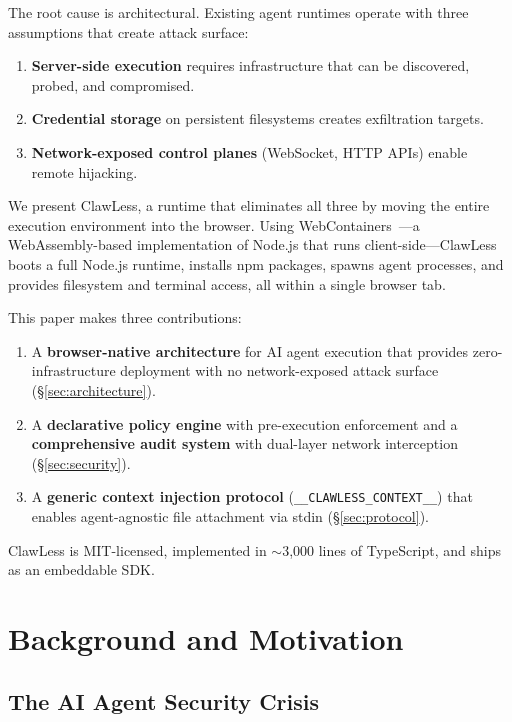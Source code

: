 \documentclass[11pt,twocolumn]{article}
\begin{document}
The root cause is architectural. Existing agent runtimes operate with three assumptions that create attack surface:

\begin{enumerate}[noitemsep]
  \item \textbf{Server-side execution} requires infrastructure that can be discovered, probed, and compromised.
  \item \textbf{Credential storage} on persistent filesystems creates exfiltration targets.
  \item \textbf{Network-exposed control planes} (WebSocket, HTTP APIs) enable remote hijacking.
\end{enumerate}

We present ClawLess, a runtime that eliminates all three by moving the entire execution environment into the browser. Using WebContainers~\cite{webcontainers}---a WebAssembly-based implementation of Node.js that runs client-side---ClawLess boots a full Node.js runtime, installs npm packages, spawns agent processes, and provides filesystem and terminal access, all within a single browser tab.

This paper makes three contributions:

\begin{enumerate}[noitemsep]
  \item A \textbf{browser-native architecture} for AI agent execution that provides zero-infrastructure deployment with no network-exposed attack surface (\S\ref{sec:architecture}).
  \item A \textbf{declarative policy engine} with pre-execution enforcement and a \textbf{comprehensive audit system} with dual-layer network interception (\S\ref{sec:security}).
  \item A \textbf{generic context injection protocol} (\texttt{\_\_CLAWLESS\_CONTEXT\_\_}) that enables agent-agnostic file attachment via stdin (\S\ref{sec:protocol}).
\end{enumerate}

ClawLess is MIT-licensed, implemented in $\sim$3,000 lines of TypeScript, and ships as an embeddable SDK.

\section{Background and Motivation}
\label{sec:background}

\subsection{The AI Agent Security Crisis}
\end{document}
